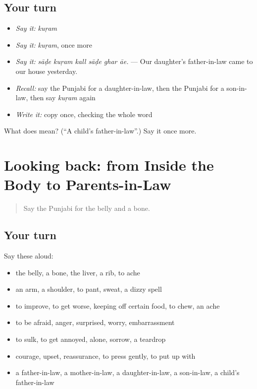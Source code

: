 \subsection*{Your turn}
\begin{itemize}
\raggedright
  \item \emph{Say it:} \emph{kuṛam}
  \item \emph{Say it:} \emph{kuṛam}, once more
  \item \emph{Say it:} \emph{sāḍe kuṛam kall sāḍe ghar āe.} — Our daughter's father-in-law came to our house yesterday.
  \item \emph{Recall:} say the Punjabi for a daughter-in-law, then the Punjabi for a son-in-law, then say \emph{kuṛam} again
  \item \emph{Write it:} copy \textbf{} once, checking the whole word
\end{itemize}

\begin{tcolorbox}[breakable,colback=teal!4,colframe=teal!35!black,title={Before you move on}]
What does  mean? (\textquotedblleft{}A child's father-in-law\textquotedblright{}.) Say it once more.
\end{tcolorbox}
\section[(dialogue)]{Looking back: from Inside the Body to Parents-in-Law}

\label{lesson:PA-R329-review-323-329}



\begin{quote}
Say the Punjabi for the belly and a bone.
\end{quote}

\subsection*{Your turn}
Say these aloud:

\begin{itemize}
\raggedright
  \item the belly, a bone, the liver, a rib, to ache
  \item an arm, a shoulder, to pant, sweat, a dizzy spell
  \item to improve, to get worse, keeping off certain food, to chew, an ache
  \item to be afraid, anger, surprised, worry, embarrassment
  \item to sulk, to get annoyed, alone, sorrow, a teardrop
  \item courage, upset, reassurance, to press gently, to put up with
  \item a father-in-law, a mother-in-law, a daughter-in-law, a son-in-law, a child's father-in-law
\end{itemize}

